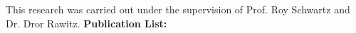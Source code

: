 This research was carried out under the supervision of Prof. Roy Schwartz and Dr. Dror Rawitz.
\vfill
\noindent\textbf{Publication List:}
\begin{bibunit}
    \renewcommand{\chapter}[2]{}%
    \makeatletter
    \renewcommand\@biblabel[1]{#1.}
    \makeatother
    \nocite{*}
\end{bibunit}